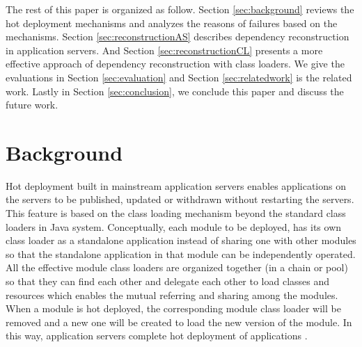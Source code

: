 \documentclass[conference]{IEEEtran}
\begin{document}
The rest of this paper is organized as follow. 
Section \ref{sec:background} reviews the hot deployment mechanisms and analyzes the reasons of failures based on the mechanisms. Section \ref{sec:reconstructionAS} describes dependency reconstruction in application servers. And Section \ref{sec:reconstructionCL} presents a more effective approach of dependency reconstruction with class loaders.
We give the evaluations in Section \ref{sec:evaluation} and Section \ref{sec:relatedwork} is the related work. Lastly in Section \ref{sec:conclusion}, we conclude this paper and discuss the future work.



\section{Background\label{sec:background}}


Hot deployment built in mainstream application servers enables applications on the servers to be published, updated or withdrawn without restarting the servers. This feature is based on the class loading mechanism beyond the standard class loaders \cite{standard_cl} in Java system. Conceptually, each module to be deployed, has its own class loader as a standalone application instead of sharing one with other modules so that the standalone application in that module can be independently operated. All the effective module class loaders are organized together (in a chain or pool) so that they can find each other and delegate each other to load classes and resources which enables the mutual referring and sharing among the modules. When a module is hot deployed, the corresponding module class loader will be removed and a new one will be created to load the new version of the module. In this way, application servers complete hot deployment of applications \cite{module_cl}.
\end{document}

